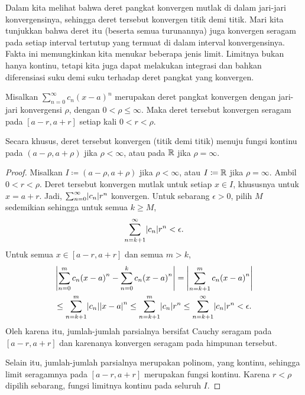 Dalam  kita melihat bahwa deret pangkat konvergen
mutlak di dalam jari-jari konvergensinya, sehingga deret tersebut konvergen titik demi titik.
Mari kita tunjukkan bahwa deret itu (beserta semua turunannya) juga konvergen seragam
pada setiap interval tertutup yang termuat di dalam interval konvergensinya.
Fakta ini memungkinkan kita
menukar beberapa jenis limit.  Limitnya bukan hanya kontinu,
tetapi kita juga dapat melakukan integrasi dan bahkan diferensiasi suku demi suku
terhadap deret pangkat yang konvergen.

\begin{prop}
Misalkan $\sum_{n=0}^\infty c_n {(x-a)}^n$ merupakan deret pangkat konvergen dengan
jari-jari konvergensi $\rho$, dengan $0 < \rho \leq \infty$.
Maka deret tersebut konvergen seragam
pada $[a-r,a+r]$ setiap kali $0 < r < \rho$.

Secara khusus, deret tersebut konvergen (titik demi titik) menuju fungsi kontinu
pada $(a-\rho,a+\rho)$ jika $\rho < \infty$, atau pada ${\mathbb{R}}$ jika $\rho = \infty$.
\end{prop}

\begin{proof}
Misalkan $I \coloneqq (a-\rho,a+\rho)$ jika $\rho < \infty$,
atau $I \coloneqq {\mathbb{R}}$ jika $\rho= \infty$.
Ambil $0 < r < \rho$.
Deret tersebut konvergen mutlak untuk setiap $x \in I$,
khususnya untuk $x = a+r$.
Jadi, $\sum_{n=0}^\infty \lvert {c_n} \rvert r^n$ konvergen.
Untuk sebarang $\epsilon >0$, pilih $M$ sedemikian sehingga untuk semua $k \geq M$,
\begin{equation*}
\sum_{n=k+1}^\infty \lvert {c_n} \rvert {r}^n < \epsilon .
\end{equation*}
Untuk semua $x \in [a-r,a+r]$ dan semua $m > k$,
\begin{multline*}
\left\lvert {\sum_{n=0}^m c_n {(x-a)}^n - 
\sum_{n=0}^k c_n {(x-a)}^n} \right\rvert
=
\left\lvert {\sum_{n=k+1}^m c_n {(x-a)}^n} \right\rvert
\\
\leq
\sum_{n=k+1}^m \lvert {c_n} \rvert {\lvert {x-a} \rvert}^n
\leq
\sum_{n=k+1}^m \lvert {c_n} \rvert {r}^n
\leq
\sum_{n=k+1}^\infty \lvert {c_n} \rvert {r}^n
<\epsilon.
\end{multline*}
Oleh karena itu, jumlah-jumlah parsialnya bersifat Cauchy seragam pada $[a-r,a+r]$ dan
karenanya konvergen seragam pada himpunan tersebut.

Selain itu, jumlah-jumlah parsialnya merupakan polinom, yang
kontinu, sehingga limit seragamnya pada $[a-r,a+r]$
merupakan fungsi kontinu.
Karena $r < \rho$ dipilih sebarang, fungsi limitnya
kontinu pada seluruh $I$.
\end{proof}

